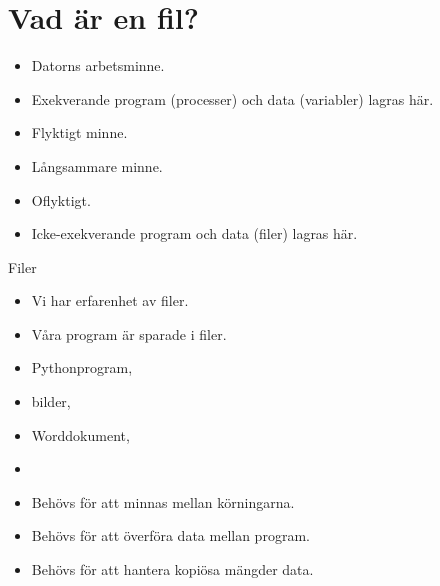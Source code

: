 \mode*

\section{Vad är en fil?}

\begin{frame}
  \begin{definition}[Primärminne]
    \begin{itemize}
      \item Datorns arbetsminne.
      \item Exekverande program (processer) och data (variabler) lagras här.
      \item Flyktigt minne.
    \end{itemize}
  \end{definition}

  \begin{definition}[Sekundärminne]
    \begin{itemize}
      \item Långsammare minne.
      \item Oflyktigt.
      \item Icke-exekverande program och data (filer) lagras här.
    \end{itemize}
  \end{definition}
\end{frame}

\begin{frame}
  \begin{block}{Filer}
    \begin{itemize}
      \item Vi har erfarenhet av filer.
      \item Våra program är sparade i filer.
    \end{itemize}
  \end{block}

  \pause

  \begin{example}
    \begin{itemize}
      \item Pythonprogram,
      \item bilder,
      \item Worddokument,
      \item \etc
    \end{itemize}
  \end{example}
\end{frame}

\begin{frame}
  \begin{remark}
    \begin{itemize}
      \item Behövs för att minnas mellan körningarna.
      \item Behövs för att överföra data mellan program.
      \item Behövs för att hantera kopiösa mängder data.
    \end{itemize}
  \end{remark}
\end{frame}


